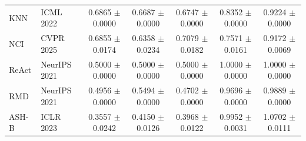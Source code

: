 \begin{table}[!htbp]
{\begin{tabular}{llccccc}
KNN & ICML 2022 & 0.6865 $\pm$ 0.0000 & 0.6687 $\pm$ 0.0000 & 0.6747 $\pm$ 0.0000 & 0.8352 $\pm$ 0.0000 & 0.9224 $\pm$ 0.0000 \\
NCI & CVPR 2025 & 0.6855 $\pm$ 0.0174 & 0.6358 $\pm$ 0.0234 & 0.7079 $\pm$ 0.0182 & 0.7571 $\pm$ 0.0161 & 0.9172 $\pm$ 0.0069 \\
ReAct & NeurIPS 2021 & 0.5000 $\pm$ 0.0000 & 0.5000 $\pm$ 0.0000 & 0.5000 $\pm$ 0.0000 & 1.0000 $\pm$ 0.0000 & 1.0000 $\pm$ 0.0000 \\
RMD & NeurIPS 2021 & 0.4956 $\pm$ 0.0000 & 0.5494 $\pm$ 0.0000 & 0.4702 $\pm$ 0.0000 & 0.9696 $\pm$ 0.0000 & 0.9889 $\pm$ 0.0000 \\
ASH-B & ICLR 2023 & 0.3557 $\pm$ 0.0242 & 0.4150 $\pm$ 0.0126 & 0.3968 $\pm$ 0.0122 & 0.9952 $\pm$ 0.0031 & 1.0702 $\pm$ 0.0111 \\
\bottomrule
\end{tabular}%
}
\end{table}

\clearpage
